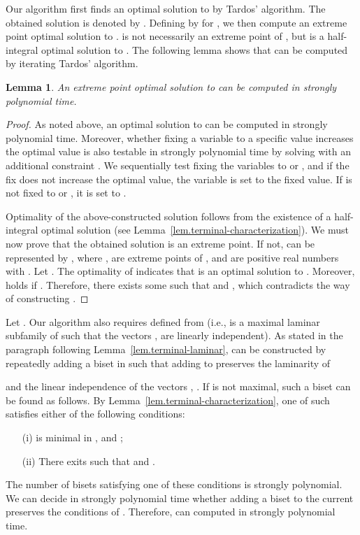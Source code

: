 \documentclass{article}
\newtheorem{lemma}{Lemma}
\begin{document}
Our algorithm first finds an optimal solution to  by Tardos' algorithm.
The obtained solution is denoted by .
Defining  by  for , we then compute an extreme point optimal solution  to .
 is not necessarily an extreme point of ,
but is a half-integral optimal solution to .
The following lemma shows that 
 can be computed by iterating Tardos' algorithm.

\begin{lemma}\label{lem.lp-stronglypoly}
An extreme point optimal solution to  
can be computed in strongly polynomial time.
\end{lemma}
 \begin{proof}
  As noted above, 
an optimal solution to  
can be computed in strongly polynomial time.
Moreover, 
whether fixing a variable  to a specific value 
increases the optimal value is also testable in strongly polynomial time 
by solving  
with an additional constraint . 
We sequentially test fixing the variables  to  or ,
and if the fix does not increase the optimal value, the variable is set to the fixed value.
If  is not fixed to  or ,
it is set to .

Optimality of the above-constructed solution  
follows from the existence of a half-integral optimal
solution (see Lemma~\ref{lem.terminal-characterization}).
We must now prove that the obtained solution  is an extreme point.
If not,  can be represented by
, where ,
 are extreme points of ,
and  are positive real numbers with
.
Let .
The optimality of  indicates that
 is an optimal solution to 
.
Moreover,   holds if .
Therefore, there exists some  such that  and ,
which contradicts the way of constructing .
 \end{proof}

 Let .
 Our algorithm also requires  defined from  (i.e.,  is
 a maximal laminar subfamily of 
such that the vectors , 
 are linearly independent).
 As stated in the paragraph following Lemma~\ref{lem.terminal-laminar},
  can be constructed by
 repeatedly adding a
 biset  in 
 such that adding  to  preserves the laminarity of
 
 and the linear independence of the vectors 
 , .
 If  is not maximal, such a biset  
 can be found as follows.
 By Lemma~\ref{lem.terminal-characterization}, 
 one of such  satisfies either of the following conditions:
 \begin{itemize}
  \item[(i)]   is minimal in , and ;
  \item[(ii)] There exits  such that
	 and
	.
 \end{itemize}
 The number of bisets satisfying one of these conditions is strongly
 polynomial.
We can decide in strongly polynomial time whether adding
a biset to the current  preserves the conditions of . 
Therefore,  can computed in strongly polynomial time.
\end{document}
